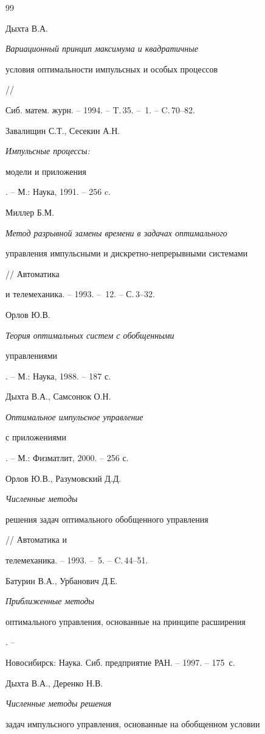 \begin{thebibliography}{99}







Дыхта В.А. {\em Вариационный принцип максимума и квадратичные 


условия оптимальности импульсных и особых процессов} // 


Сиб. матем. журн. -- 1994. -- T.\,35. -- \No\,1. -- C.\,70--82.




Завалищин С.Т., Сесекин А.Н. {\em Импульсные процессы:


модели и приложения}. -- М.: Наука, 1991. -- 256 c.




Миллер Б.М. {\em Метод разрывной замены времени в задачах оптимального


управления импульсными и дискретно-непрерывными системами} // Автоматика 


и телемеханика. -- 1993. -- \No\,12. -- С.\,3--32.




Орлов Ю.В. {\em Теория оптимальных систем с обобщенными


управлениями}. -- М.: Наука, 1988. -- 187 с.




Дыхта В.А., Самсонюк О.Н. {\em Оптимальное импульсное управление 


с приложениями}. -- М.: Физматлит, 2000. -- 256 с.




Орлов Ю.В., Разумовский Д.Д. {\em Численные методы 


решения задач оптимального обобщенного управления} // Автоматика и


телемеханика. -- 1993. -- \No\,5. -- C.\,44--51.




Батурин В.А., Урбанович Д.Е. {\em Приближенные методы 


оптимального управления, основанные на принципе расширения}. --


Новосибирск: Наука. Сиб. предприятие РАН. -- 1997. -- 175~с.




Дыхта В.А., Деренко Н.В. {\em Численные методы решения


задач импульсного управления, основанные на обобщенном условии 


}
\end{thebibliography}
